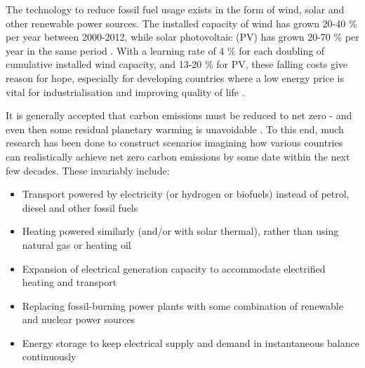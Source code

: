\documentclass[report_18month.tex]{subfiles}
\begin{document}
The technology to reduce fossil fuel usage exists in the form of wind, solar and other renewable power sources. The installed capacity of wind has grown 20-40 \% per year between 2000-2012, while solar photovoltaic (PV) has grown 20-70 \% per year in the same period \citep{carbajales2014storage}. With a learning rate of 4 \% for each doubling of cumulative installed wind capacity, and 13-20 \% for PV, these falling costs give reason for hope, especially for developing countries where a low energy price is vital for industrialisation and improving quality of life \citep{tol2017socialcost}.

It is generally accepted that carbon emissions must be reduced to net zero - and even then some residual planetary warming is unavoidable \citep{frolicher2014co2}. To this end, much research has been done to construct scenarios imagining how various countries can realistically achieve net zero carbon emissions by some date within the next few decades. \citep{sluisveld2016nweu,eu2011roadmap2050,chai2014modeling,ccc2008} These invariably include:
\begin{itemize}
\item Transport powered by electricity (or hydrogen or biofuels) instead of petrol, diesel and other fossil fuels
\item Heating powered similarly (and/or with solar thermal), rather than using natural gas or heating oil
\item Expansion of electrical generation capacity to accommodate electrified heating and transport
\item Replacing fossil-burning power plants with some combination of renewable and nuclear power sources
\item Energy storage to keep electrical supply and demand in instantaneous balance continuously
\end{itemize}
\end{document}

